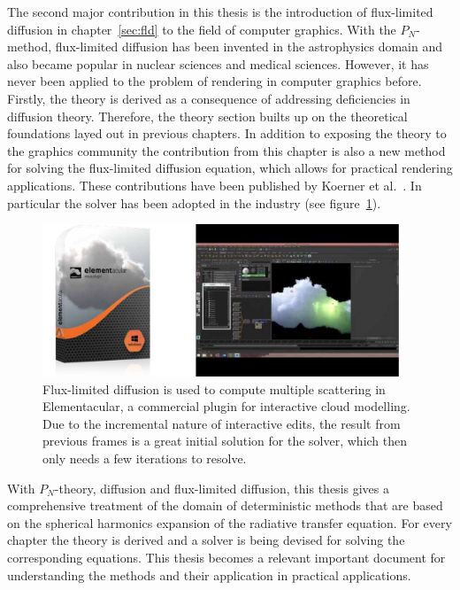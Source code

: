 The second major contribution in this thesis is the introduction of flux-limited diffusion in chapter~\ref{sec:fld} to the field of computer graphics. With the $P_N$-method, flux-limited diffusion has been invented in the astrophysics domain and also became popular in nuclear sciences and medical sciences. However, it has never been applied to the problem of rendering in computer graphics before. Firstly, the theory is derived as a consequence of addressing deficiencies in diffusion theory. Therefore, the theory section builts up on the theoretical foundations layed out in previous chapters. In addition to exposing the theory to the graphics community the contribution from this chapter is also a new method for solving the flux-limited diffusion equation, which allows for practical rendering applications. These contributions have been published by Koerner et al.~\cite{Koerner14}. In particular the solver has been adopted in the industry (see figure~\ref{fig:fld_conclusion_elementacular_1}).
\begin{figure}[h]
\centering
\includegraphics[width=0.95\textwidth]{07_conclusion/figures/fig_elementacular.pdf}
\caption{Flux-limited diffusion is used to compute multiple scattering in Elementacular\protect\footnotemark, a commercial plugin for interactive cloud modelling. Due to the incremental nature of interactive edits, the result from previous frames is a great initial solution for the solver, which then only needs a few iterations to resolve.}
\label{fig:fld_conclusion_elementacular_1}
\end{figure}


With $P_N$-theory, diffusion and flux-limited diffusion, this thesis gives a comprehensive treatment of the domain of deterministic methods that are based on the spherical harmonics expansion of the radiative transfer equation. For every chapter the theory is derived and a solver is being devised for solving the corresponding equations. This thesis becomes a relevant important document for understanding the methods and their application in practical applications. 

